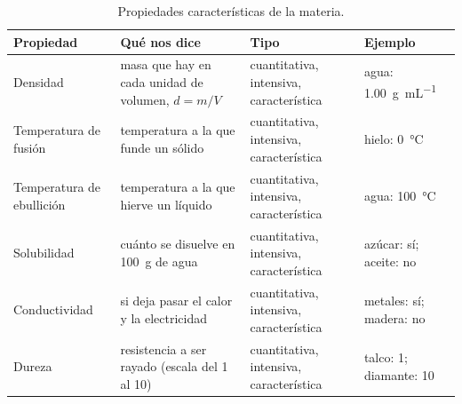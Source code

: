 \begin{table}[H]
    \centering
    \small
    \renewcommand{\arraystretch}{1.35}
    \begin{tabular}{p{2.2cm}p{3.8cm}p{3.0cm}p{3.2cm}}
        \toprule
        \textbf{Propiedad} & \textbf{Qué nos dice} & \textbf{Tipo} & \textbf{Ejemplo} \\
        \midrule
        Densidad & masa que hay en cada unidad de volumen, \(d = m/V\) & cuantitativa, intensiva, característica & agua: \qty{1.00}{\g\per\mL} \\
        Temperatura de fusión & temperatura a la que funde un sólido & cuantitativa, intensiva, característica & hielo: \qty{0}{\celsius} \\
        Temperatura de ebullición & temperatura a la que hierve un líquido & cuantitativa, intensiva, característica & agua: \qty{100}{\celsius} \\
        Solubilidad & cuánto se disuelve en \qty{100}{\g} de agua & cuantitativa, intensiva, característica & azúcar: sí; aceite: no \\
        Conductividad & si deja pasar el calor y la electricidad & cuantitativa, intensiva, característica & metales: sí; madera: no \\
        Dureza & resistencia a ser rayado (escala del 1 al 10) & cuantitativa, intensiva, característica & talco: 1; diamante: 10 \\
        \bottomrule
    \end{tabular}
    \caption{Propiedades características de la materia.}
    \label{tab:u1_characteristic}
\end{table}

